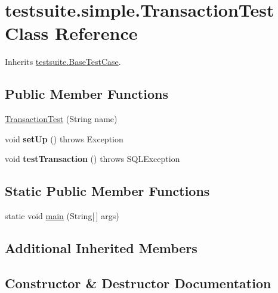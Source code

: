 \hypertarget{classtestsuite_1_1simple_1_1_transaction_test}{}\section{testsuite.\+simple.\+Transaction\+Test Class Reference}
\label{classtestsuite_1_1simple_1_1_transaction_test}


Inherits \mbox{\hyperlink{classtestsuite_1_1_base_test_case}{testsuite.\+Base\+Test\+Case}}.

\subsection*{Public Member Functions}
\begin{DoxyCompactItemize}
\item 
\mbox{\hyperlink{classtestsuite_1_1simple_1_1_transaction_test_a05b3cfd3ac06847339ca8345cda8fe96}{Transaction\+Test}} (String name)
\item 
\mbox{\label{classtestsuite_1_1simple_1_1_transaction_test_a28bb243468ffb003fc134f48ff74a740}} 
void {\bfseries set\+Up} ()  throws Exception 
\item 
\mbox{\label{classtestsuite_1_1simple_1_1_transaction_test_afd13b74216f8498467a73d6b4df6ff57}} 
void {\bfseries test\+Transaction} ()  throws S\+Q\+L\+Exception 
\end{DoxyCompactItemize}
\subsection*{Static Public Member Functions}
\begin{DoxyCompactItemize}
\item 
static void \mbox{\hyperlink{classtestsuite_1_1simple_1_1_transaction_test_a64f59050254d996e0009d60f8cfed9ae}{main}} (String\mbox{[}$\,$\mbox{]} args)
\end{DoxyCompactItemize}
\subsection*{Additional Inherited Members}


\subsection{Constructor \& Destructor Documentation}
\mbox{\label{classtestsuite_1_1simple_1_1_transaction_test_a05b3cfd3ac06847339ca8345cda8fe96}} 
